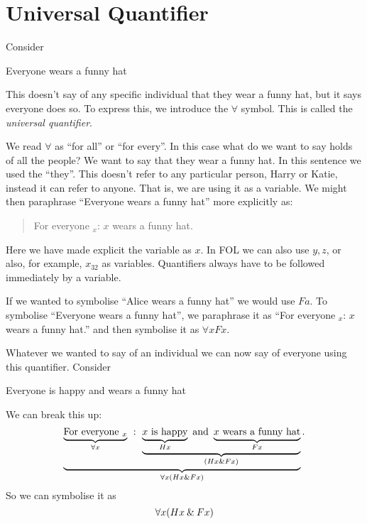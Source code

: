 \section{Universal Quantifier}

Consider 
\begin{earg}
\item[\ex{q.hat}] Everyone wears a funny hat
\end{earg}
This doesn't say of any specific individual that they wear a funny hat, but it says everyone does so. To express this, we introduce the $\forall$ symbol. This is called the \emph{universal quantifier}.



We read $\forall$ as ``for all'' or ``for every''. In this case what do we want to say holds of all the people? We want to say that they wear a funny hat. In this sentence we used the ``they''. This doesn't refer to any particular person, Harry or Katie, instead it can refer to anyone. That is, we are using it as a variable. 
We might then paraphrase ``Everyone wears a funny hat'' more explicitly as:
\begin{quotation}
For everyone $_x$: $x$ wears a funny hat.
\end{quotation}

Here we have made explicit the variable as $x$. In FOL we can also use $y,z$, or also, for example, $x_{32}$ as variables. Quantifiers always have to be followed immediately by a variable. 


If we wanted to symbolise ``Alice wears a funny hat'' we would use $Fa$. To symbolise ``Everyone wears a funny hat'', we paraphrase it as ``For everyone $_x$: $x$ wears a funny hat.'' and then symbolise it as $\forall x Fx$. 


Whatever we wanted to say of an individual we can now say of everyone using this quantifier.  Consider
\begin{earg}
\item[\ex{q.hat}] Everyone is happy and wears a funny hat
\end{earg}
We can break this up:
\begin{equation*}
\underbrace{\underbrace{\text{For everyone $_x$}}_{\forall x}\ :\ 
 \underbrace{\underbrace{\text{$x$ is happy}}_{Hx}\text{ and }
 \underbrace{\text{$x$ wears a funny hat}}_{Fx}}_{(Hx\eand Fx)}}_{\forall x(Hx\eand Fx)}.
\end{equation*}
So we can symbolise it as $$\forall x(Hx\mathbin{\&} Fx)$$

